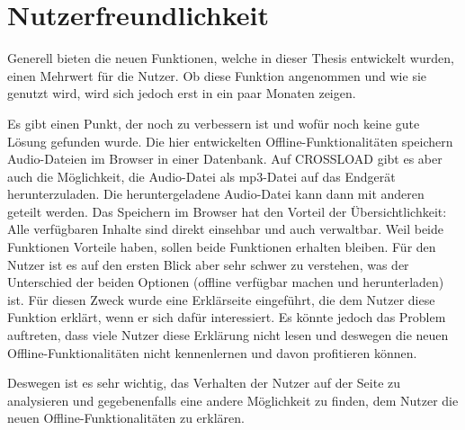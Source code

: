 \section{Nutzerfreundlichkeit}
Generell bieten die neuen Funktionen, welche in dieser Thesis entwickelt wurden, einen Mehrwert für die Nutzer. Ob diese Funktion angenommen und wie sie genutzt wird, wird sich jedoch erst in ein paar Monaten zeigen. 

Es gibt einen Punkt, der noch zu verbessern ist und wofür noch keine gute Lösung gefunden wurde. Die hier entwickelten Offline-Funktionalitäten speichern Audio-Dateien im Browser in einer Datenbank. Auf CROSSLOAD gibt es aber auch die Möglichkeit, die Audio-Datei als mp3-Datei auf das Endgerät herunterzuladen. Die heruntergeladene Audio-Datei kann dann mit anderen geteilt werden. Das Speichern im Browser hat den Vorteil der Übersichtlichkeit: Alle verfügbaren Inhalte sind direkt einsehbar und auch verwaltbar. Weil beide Funktionen Vorteile haben, sollen beide Funktionen erhalten bleiben. Für den Nutzer ist es auf den ersten Blick aber sehr schwer zu verstehen, was der Unterschied der beiden Optionen (offline verfügbar machen und herunterladen) ist. Für diesen Zweck wurde eine Erklärseite eingeführt, die dem Nutzer diese Funktion erklärt, wenn er sich dafür interessiert. Es könnte jedoch das Problem auftreten, dass viele Nutzer diese Erklärung nicht lesen und deswegen die neuen Offline-Funktionalitäten nicht kennenlernen und davon profitieren können. 

Deswegen ist es sehr wichtig, das Verhalten der Nutzer auf der Seite zu analysieren und gegebenenfalls eine andere Möglichkeit zu finden, dem Nutzer die neuen Offline-Funktionalitäten zu erklären.
